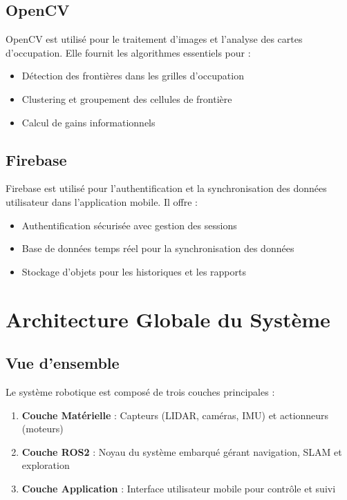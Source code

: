 \documentclass[12pt,a4paper,oneside]{report}
\begin{document}
\section{OpenCV}

OpenCV est utilisé pour le traitement d'images et l'analyse des cartes d'occupation. Elle fournit les algorithmes essentiels pour :

\begin{itemize}
  \item Détection des frontières dans les grilles d'occupation
  \item Clustering et groupement des cellules de frontière
  \item Calcul de gains informationnels
\end{itemize}

\section{Firebase}

Firebase est utilisé pour l'authentification et la synchronisation des données utilisateur dans l'application mobile. Il offre :

\begin{itemize}
  \item Authentification sécurisée avec gestion des sessions
  \item Base de données temps réel pour la synchronisation des données
  \item Stockage d'objets pour les historiques et les rapports
\end{itemize}

\newpage

\chapter{Architecture Globale du Système}

\section{Vue d'ensemble}

Le système robotique est composé de trois couches principales :

\begin{enumerate}
  \item \textbf{Couche Matérielle} : Capteurs (LIDAR, caméras, IMU) et actionneurs (moteurs)
  \item \textbf{Couche ROS2} : Noyau du système embarqué gérant navigation, SLAM et exploration
  \item \textbf{Couche Application} : Interface utilisateur mobile pour contrôle et suivi
\end{enumerate}
\end{document}
